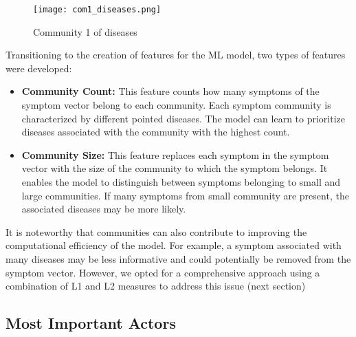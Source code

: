 \begin{figure}[H]
    \centering
    \texttt{[image: com1\_diseases.png]}
    \caption{Community 1 of diseases}\label{fig:com1_diseases}
\end{figure}

\noindent
Transitioning to the creation of features for the ML model, two types of features were developed:\\

\begin{itemize}
    \setlength\itemsep{1em} %

    \item \textbf{Community Count:} This feature counts how many symptoms of the symptom vector belong to each community.
          Each symptom community is characterized by different pointed diseases. The model can learn to prioritize
          diseases associated with the community with the highest count.

    \item \textbf{Community Size:} This feature replaces each symptom in the symptom vector with the size of the
          community to which the symptom belongs. It enables the model to distinguish between symptoms belonging to small and
          large communities. If many symptoms from small community are present, the associated diseases may be more likely.
\end{itemize}

\noindent
It is noteworthy that communities can also contribute to improving the computational efficiency of the model.
For example, a symptom associated with many diseases may be less informative and could potentially be removed from the
symptom vector. However, we opted for a comprehensive approach using a combination of L1 and L2 measures to address this issue (next section)


\subsection{Most Important Actors}\label{subsec:most_important_actors}

